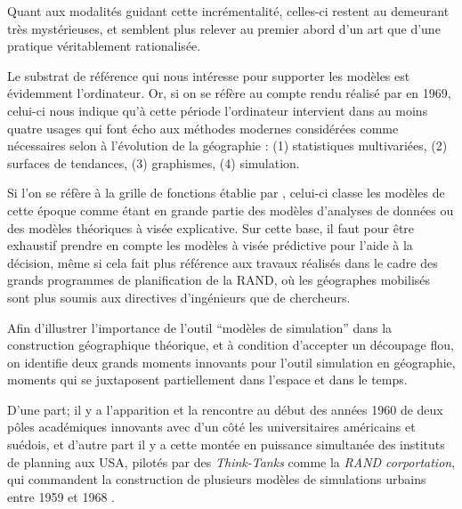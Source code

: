 Quant aux modalités guidant cette incrémentalité, celles-ci restent au demeurant très mystérieuses, et semblent plus relever au premier abord d'un art \autocites{Tocher1963, Axelrod1997} que d'une pratique véritablement rationalisée.

Le substrat de référence qui nous intéresse pour supporter les modèles est évidemment l'ordinateur. Or, si on se réfère au compte rendu réalisé par \textcite{Haggett1969} en 1969, celui-ci nous indique qu'à cette période l'ordinateur intervient dans au moins quatre usages qui font écho aux méthodes modernes considérées comme nécessaires selon \textcite{Claval1977} à l'évolution  de la géographie : (1) statistiques multivariées, (2) surfaces de tendances, (3) graphismes, (4) simulation.

Si l'on se réfère à la grille de fonctions établie par \textcite{Varenne2014}, celui-ci classe les modèles de cette époque comme étant en grande partie des modèles d'analyses de données ou des modèles théoriques à visée explicative. Sur cette base, il faut pour être exhaustif prendre en compte les modèles à visée prédictive pour l'aide à la décision, même si cela fait plus référence aux travaux réalisés dans le cadre des grands programmes de planification de la RAND, où les géographes mobilisés sont plus soumis aux directives d'ingénieurs que de chercheurs.


Afin d'illustrer l'importance de l'outil \enquote{modèles de simulation} dans la construction géographique théorique, et à condition d'accepter un découpage flou, on identifie deux grands moments innovants pour l'outil simulation en géographie, moments qui se juxtaposent partiellement dans l'espace et dans le temps.

D'une part; il y a l'apparition et la rencontre au début des années 1960 de deux pôles académiques innovants avec d'un côté les universitaires américains et suédois, et d'autre part il y a cette montée en puissance simultanée des instituts de planning aux USA, pilotés par des \textit{Think-Tanks} comme la \textit{RAND corportation}, qui commandent la construction de plusieurs modèles de simulations urbains entre 1959 et 1968 \autocite[307]{Batty1976}.

